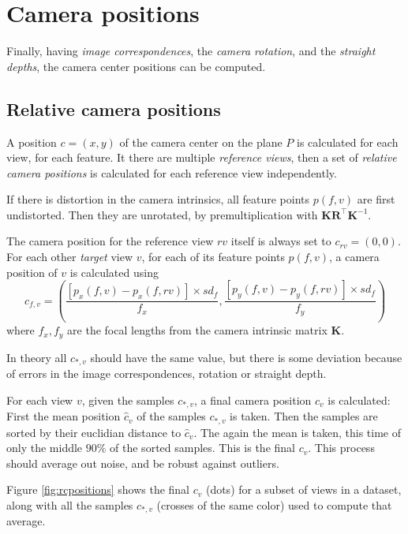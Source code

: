 \documentclass{scrreprt}
\newcommand{\matr}[1]{\mathbf{#1}}
\newcommand{\transpose}[1]{#1^\intercal}
\begin{document}
\pagebreak

\section{Camera positions}
Finally, having \emph{image correspondences}, the \emph{camera rotation}, and the \emph{straight depths}, the camera center positions can be computed.

\subsection{Relative camera positions}
A position $c = (x, y)$ of the camera center on the plane $P$ is calculated for each view, for each feature. It there are multiple \emph{reference views}, then a set of \emph{relative camera positions} is calculated for each reference view independently.

If there is distortion in the camera intrinsics, all feature points $p(f,v)$ are first undistorted. Then they are unrotated, by premultiplication with $\matr{K} \transpose{\matr{R}} \matr{K}^{-1}$.

The camera position for the reference view $rv$  itself is always set to $c_{rv} = (0, 0)$. For each other \emph{target} view $v$, for each of its feature points $p(f,v)$, a camera position of $v$ is calculated using
\begin{equation*}
c_{f,v} = \left( \frac{\left[p_x(f,v) - p_x(f,rv)\right] \times sd_f}{f_x}, \frac{\left[p_y(f,v) - p_y(f,rv)\right] \times sd_f}{f_y} \right)
\end{equation*}
where $f_x, f_y$ are the focal lengths from the camera intrinsic matrix $\matr{K}$.

In theory all $c_{*,v}$ should have the same value, but there is some deviation because of errors in the image correspondences, rotation or straight depth.

For each view $v$, given the samples $c_{*,v}$, a final camera position $c_v$ is calculated: First the mean position $\hat{c}_v$ of the samples $c_{*,v}$ is taken. Then the samples are sorted by their euclidian distance to $\hat{c}_v$. The again the mean is taken, this time of only the middle $90\%$ of the sorted samples. This is the final $c_v$. This process should average out noise, and be robust against outliers.

Figure \ref{fig:rcpositions} shows the final $c_v$ (dots) for a subset of views in a dataset, along with all the samples $c_{*,v}$ (crosses of the same color) used to compute that average.
\end{document}
